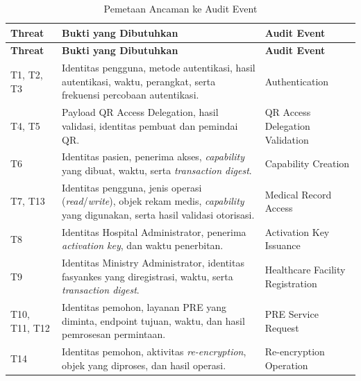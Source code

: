 \begin{xltabular}
    {\textwidth}
    {|>{\centering\arraybackslash}p{1.8cm}
     |>{\raggedright\arraybackslash}p{5.1cm}
     |X|}

\caption{Pemetaan Ancaman ke Audit Event}
\label{tab:threat-event-mapping}\\

\hline
\textbf{Threat} &
\textbf{Bukti yang Dibutuhkan} &
\textbf{Audit Event} \\
\hline
\endfirsthead

\hline
\textbf{Threat} &
\textbf{Bukti yang Dibutuhkan} &
\textbf{Audit Event} \\
\hline
\endhead

\hline
\endfoot

\hline
\endlastfoot

T1, T2, T3 &
Identitas pengguna, metode autentikasi, hasil autentikasi, waktu, perangkat, serta frekuensi percobaan autentikasi. &
Authentication \\
\hline

T4, T5 &
Payload QR Access Delegation, hasil validasi, identitas pembuat dan pemindai QR. &
QR Access Delegation Validation \\
\hline

T6 &
Identitas pasien, penerima akses, \textit{capability} yang dibuat, waktu, serta \textit{transaction digest}. &
Capability Creation \\
\hline

T7, T13 &
Identitas pengguna, jenis operasi (\textit{read}/\textit{write}), objek rekam medis, \textit{capability} yang digunakan, serta hasil validasi otorisasi. &
Medical Record Access \\
\hline

T8 &
Identitas Hospital Administrator, penerima \textit{activation key}, dan waktu penerbitan. &
Activation Key Issuance \\
\hline

T9 &
Identitas Ministry Administrator, identitas fasyankes yang diregistrasi, waktu, serta \textit{transaction digest}. &
Healthcare Facility Registration \\
\hline

T10, T11, T12 &
Identitas pemohon, layanan PRE yang diminta, endpoint tujuan, waktu, dan hasil pemrosesan permintaan. &
PRE Service Request \\
\hline

T14 &
Identitas pemohon, aktivitas \textit{re-encryption}, objek yang diproses, dan hasil operasi. &
Re-encryption Operation \\
\hline


\end{xltabular}
